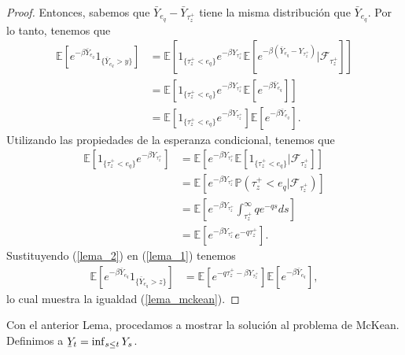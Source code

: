 \begin{proof}
Entonces, sabemos que $\bar{Y}_{e_q} - \bar{Y}_{\tau_z^{+}}$ tiene la misma distribución que $\bar{Y}_{e_q}$. Por lo tanto, tenemos que
\begin{align}
	\mathbb{E} \left[ e^{- \beta \bar{Y}_{e_q}} 1_{\{\bar{Y}_{e_q} > y\}} \right]  & = \mathbb{E} \left[ 1_{\{\tau_z^{+} < e_q\}} e^{- \beta Y_{\tau_z^{+}}} \mathbb{E} \left[ e^{- \beta (\bar{Y}_{e_q} - Y_{\tau_z^{+}})} \bigg| \mathcal{F}_{\tau_z^{+}} \right] \right] \nonumber \\
    & = \mathbb{E} \left[ 1_{\{\tau_z^{+} < e_q\}} e^{- \beta Y_{\tau_z^{+}}} \mathbb{E} \left[ e^{- \beta \bar{Y}_{e_q}} \right] \right] \nonumber \\
    & = \mathbb{E} \left[ 1_{\{\tau_z^{+} < e_q\}} e^{- \beta Y_{\tau_z^{+}}}  \right] \mathbb{E} \left[ e^{- \beta \bar{Y}_{e_q}} \right]. \label{lema_1}
\end{align}
Utilizando las propiedades de la esperanza condicional, tenemos que
\begin{align}
	\mathbb{E} \left[ 1_{\{\tau_z^{+} < e_q\}} e^{- \beta Y_{\tau_z^{+}}}  \right] & = \mathbb{E} \left[ e^{- \beta Y_{\tau_z^{+}}} \mathbb{E} \left[ 1_{ \{ \tau_z^{+} < e_q \}} \bigg| \mathcal{F}_{\tau_z^{+}} \right] \right] \nonumber \\
    & = \mathbb{E} \left[ e^{- \beta Y_{\tau_z^{+}}} \mathbb{P} \left( \tau_z^{+} < e_q \bigg| \mathcal{F}_{\tau_z^{+}} \right) \right] \nonumber \\
    & = \mathbb{E} \left[ e^{- \beta Y_{\tau_z^{+}}} \int_{\tau_z^{+}}^{\infty} q e^{-qs} ds \right] \nonumber \\
    & = \mathbb{E} \left[ e^{- \beta Y_{\tau_z^{+}}} e^{-q \tau_z^{+}} \right]. \label{lema_2}
\end{align}
Sustituyendo (\ref{lema_2}) en (\ref{lema_1}) tenemos
\begin{align*}
	\mathbb{E} \left[ e^{- \beta \bar{Y}_{e_q}} 1_{\{\bar{Y}_{e_q} > z\}} \right]  & = \mathbb{E} \left[ e^{- q \tau_z^{+} - \beta Y_{\tau_z^{+}}} \right] \mathbb{E} \left[ e^{- \beta \bar{Y}_{e_q}} \right],
\end{align*}
lo cual muestra la igualdad (\ref{lema_mckean}).
\end{proof}

Con el anterior Lema, procedamos a mostrar la solución al problema de McKean. Definimos a $\ubar{Y}_t = \inf_{s \leq t} Y_s$.

